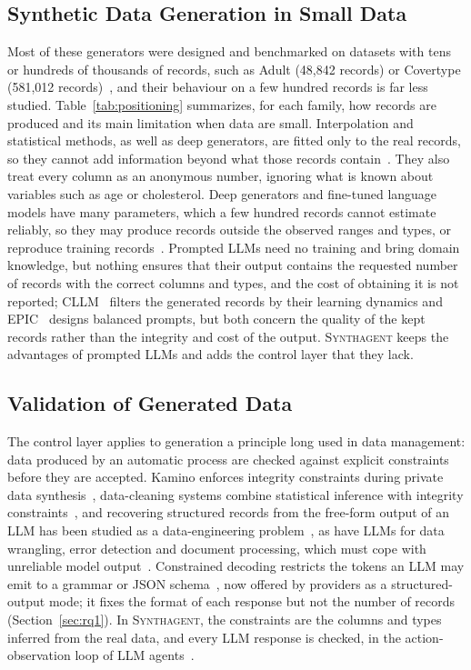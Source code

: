 \documentclass[conference]{IEEEtran}
\newcommand{\system}{\textsc{Synthagent}\xspace}
\begin{document}
\subsection{Synthetic Data Generation in Small Data}
Most of these generators were designed and benchmarked on datasets with tens or hundreds of thousands of records, such as Adult (48,842 records) or Covertype (581,012 records)~\cite{xu2019ctgan}, and their behaviour on a few hundred records is far less studied. Table~\ref{tab:positioning} summarizes, for each family, how records are produced and its main limitation when data are small. Interpolation and statistical methods, as well as deep generators, are fitted only to the real records, so they cannot add information beyond what those records contain~\cite[Sec.~2.8]{cover2006elements}. They also treat every column as an anonymous number, ignoring what is known about variables such as age or cholesterol. Deep generators and fine-tuned language models have many parameters, which a few hundred records cannot estimate reliably, so they may produce records outside the observed ranges and types, or reproduce training records~\cite{hyeong2022tabularmia}. Prompted LLMs need no training and bring domain knowledge, but nothing ensures that their output contains the requested number of records with the correct columns and types, and the cost of obtaining it is not reported; CLLM~\cite{seedat2024cllm} filters the generated records by their learning dynamics and EPIC~\cite{kim2024epic} designs balanced prompts, but both concern the quality of the kept records rather than the integrity and cost of the output. \system keeps the advantages of prompted LLMs and adds the control layer that they lack.

\subsection{Validation of Generated Data}
The control layer applies to generation a principle long used in data management: data produced by an automatic process are checked against explicit constraints before they are accepted. Kamino enforces integrity constraints during private data synthesis~\cite{ge2021kamino}, data-cleaning systems combine statistical inference with integrity constraints~\cite{chu2013holistic,qin2024bclean}, and recovering structured records from the free-form output of an LLM has been studied as a data-engineering problem~\cite{rorseth2026recovering}, as have LLMs for data wrangling, error detection and document processing, which must cope with unreliable model output~\cite{narayan2022wrangle,ni2025zeroed,shankar2025docetl}. Constrained decoding restricts the tokens an LLM may emit to a grammar or JSON schema~\cite{willard2023outlines,geng2023grammar}, now offered by providers as a structured-output mode; it fixes the format of each response but not the number of records (Section~\ref{sec:rq1}). In \system, the constraints are the columns and types inferred from the real data, and every LLM response is checked, in the action-observation loop of LLM agents~\cite{yao2023react,wang2024agentsurvey}.
\end{document}
